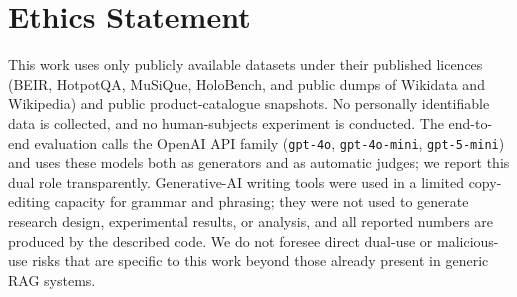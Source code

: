 \documentclass[letterpaper]{article} %
\begin{document}
\section{Ethics Statement}
This work uses only publicly available datasets under their published
licences (BEIR, HotpotQA, MuSiQue, HoloBench, and public dumps of
Wikidata and Wikipedia) and public product-catalogue snapshots. No
personally identifiable data is collected, and no human-subjects
experiment is conducted. The end-to-end evaluation calls the OpenAI API
family (\texttt{gpt-4o}, \texttt{gpt-4o-mini}, \texttt{gpt-5-mini}) and
uses these models both as generators and as automatic judges; we report
this dual role transparently. Generative-AI writing tools were used in a
limited copy-editing capacity for grammar and phrasing; they were not
used to generate research design, experimental results, or analysis, and
all reported numbers are produced by the described code. We do not
foresee direct dual-use or malicious-use risks that are specific to this
work beyond those already present in generic RAG systems.


\end{document}
